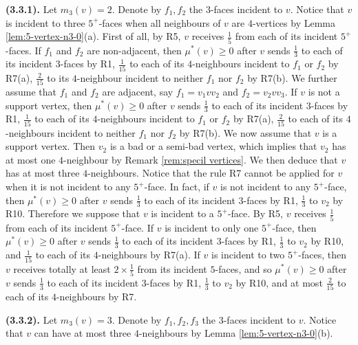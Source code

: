 \documentclass[12pt, reqno]{amsart}
\theoremstyle{plain}
\theoremstyle{definition}
\numberwithin{equation}{section}
\begin{document}
\textbf{(3.3.1).} Let  $m_3(v)= 2$. Denote by $f_1,f_2$ the $3$-faces incident to $v$. Notice that $v$ is incident to three $5^+$-faces when all neighbours of  $v$ are $4$-vertices by Lemma \ref{lem:5-vertex-n3-0}(a). %
First of all, by R5, $v$ receives $\frac{1}{5}$ from  each of its incident $5^+$-faces. If $f_1$ and $f_2$ are non-adjacent, then $\mu^*(v)\geq 0$ after $v$ sends $\frac{1}{3}$ to each of its incident $3$-faces by R1, $\frac{1}{15}$ to each of its $4$-neighbours incident to $f_1$ or $f_2$ by R7(a), $\frac{2}{15}$ to its $4$-neighbour incident to neither $f_1$ nor $f_2$ by R7(b).  
We further assume that $f_1$ and $f_2$ are adjacent, say $f_1=v_1vv_2$ and $f_2=v_2vv_3$. 
%
If $v$ is not a support vertex, then $\mu^*(v)\geq 0$ after $v$ sends $\frac{1}{3}$ to each of its incident $3$-faces by R1, $\frac{1}{15}$ to each of its $4$-neighbours incident to $f_1$ or $f_2$ by R7(a), $\frac{2}{15}$ to each of its $4$-neighbours incident to neither $f_1$ nor $f_2$ by R7(b).  
%
%
We now assume that $v$ is a support vertex. Then $v_2$ is a bad or a semi-bad vertex, which implies that $v_2$ has at most one $4$-neighbour by Remark \ref{rem:specil vertices}. We then deduce that $v$ has at most three $4$-neighbours. Notice that the rule R7 cannot be applied for $v$ when it is not incident to any $5^+$-face. In fact, if $v$ is not incident to any $5^+$-face, then    $\mu^*(v)\geq 0$ after $v$ sends $\frac{1}{3}$ to each of its incident $3$-faces by R1, $\frac{1}{3}$ to $v_2$ by R10.
Therefore we suppose that $v$ is incident to a $5^+$-face.  By R5, $v$ receives $\frac{1}{5}$ from  each of its incident $5^+$-face. If $v$ is incident to only one $5^+$-face, then $\mu^*(v)\geq 0$ after $v$ sends $\frac{1}{3}$ to each of its incident $3$-faces by R1, $\frac{1}{3}$ to $v_2$ by R10, and $\frac{1}{15}$ to each of its $4$-neighbours by R7(a). If $v$ is incident to two $5^+$-faces, then $v$ receives totally at least $2\times \frac{1}{5}$ from its incident $5$-faces, and so $\mu^*(v)\geq 0$ after $v$ sends $\frac{1}{3}$ to each of its incident $3$-faces by R1, $\frac{1}{3}$ to $v_2$ by R10, and at most $\frac{2}{15}$ to each of its $4$-neighbours by R7. \medskip



\textbf{(3.3.2).} Let $m_3(v)=3$. Denote by $f_1,f_2,f_3$ the $3$-faces incident to $v$.
Notice that $v$ can have at most three $4$-neighbours by Lemma \ref{lem:5-vertex-n3-0}(b). 
\end{document}
